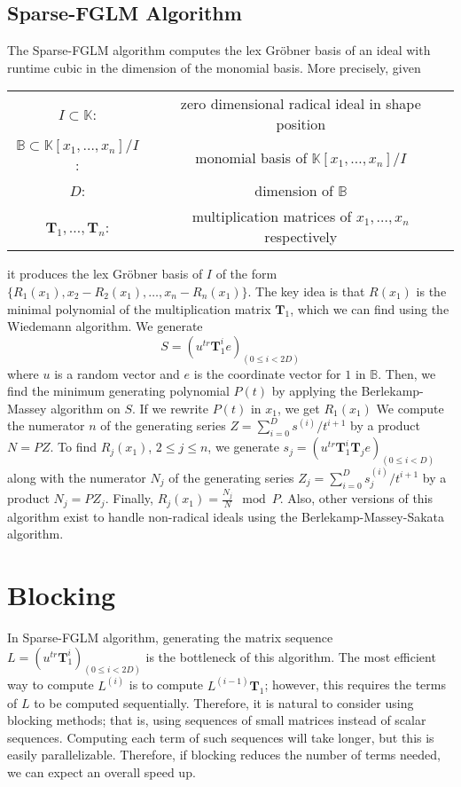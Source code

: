 \documentclass[12pt]{article}
\def\mT{\mathbf{T}}
\begin{document}
\subsection{Sparse-FGLM Algorithm}
The Sparse-FGLM algorithm \cite{FaMo17} computes the lex
Gr\"obner basis of an ideal with runtime cubic in the dimension
of the monomial basis. More precisely, given

\begin{center}
\begin{tabular}{c c}
	$I \subset \mathbb{K}$:& zero dimensional radical ideal
	in shape position\\
	$\mathbb{B} \subset \mathbb{K}[x_1,\dots,x_n]/I$:&
	monomial basis of $\mathbb{K}[x_1,\dots,x_n]/I$\\
	$D$: & dimension of $\mathbb{B}$\\
	$\mT_1,\dots,\mT_n$:& multiplication matrices of
	$x_1,\dots,x_n$ respectively	
\end{tabular}
\end{center}
it produces the lex Gr\"obner basis of $I$ of the form
$\{ R_1(x_1), x_2-R_2(x_1),\dots, x_n - R_n(x_1)  \}$.
The key idea is that $R(x_1)$ is the minimal polynomial
of the multiplication matrix $\mT_1$, which we can
find using the Wiedemann algorithm. We generate
$$ S = (u^{tr} \mT^i_1 e)_{(0 \le i < 2D)}$$
where $u$ is a random vector and $e$ is the coordinate
vector for $1$ in $\mathbb{B}$. Then, we find the minimum
generating polynomial $P(t)$ by
applying the Berlekamp-Massey algorithm on $S$.
If we rewrite $P(t)$ in $x_1$, we get $R_1(x_1)$
We compute the numerator $n$ of the generating series
$Z = \sum_{i=0}^{D} s^{(i)}/t^{i+1}$ by a product
$N = P Z$. To find $R_j(x_1)$, $2 \le j \le n$, we
generate $s_j = (u^{tr} \mT_1^i \mT_j e)_{(0 \le i < D)}$
along with the numerator $N_j$ of the generating series
$Z_j = \sum_{i=0}^{D} s_j^{(i)} / t^{i+1}$ by a product
$N_j = P Z_j$. Finally, $R_j(x_1) = \frac{N_j}{N} \mod P$.
Also, other versions of this algorithm exist to handle
non-radical ideals using the Berlekamp-Massey-Sakata algorithm.

\newpage
\section{Blocking}
In Sparse-FGLM algorithm, generating the matrix sequence 
$L = (u^{tr} \mT_1^i)_{(0 \le i < 2D)}$ is the bottleneck of this
algorithm. The most efficient way to compute $L^{(i)}$ is
to compute $L^{(i-1)}\mT_1$; however, this requires the terms
of $L$ to be computed sequentially. Therefore, it is natural to
consider using blocking methods; that is, using
sequences of small matrices instead of scalar
sequences. Computing each
term of such sequences will take longer, but this is easily
parallelizable. Therefore, if blocking reduces the number of terms
needed, we can expect an overall speed up.
\end{document}
